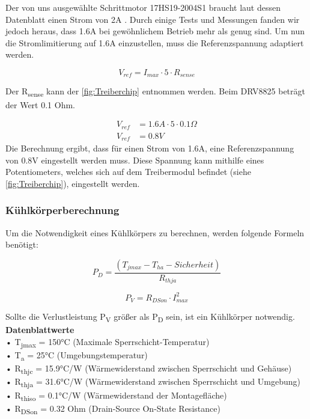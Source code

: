 Der von uns ausgewählte Schrittmotor 17HS19-2004S1 braucht laut dessen Datenblatt einen Strom von 2A .
Durch einige Tests und Messungen fanden wir jedoch heraus, dass 1.6A bei gewöhnlichem Betrieb mehr als genug sind.
Um nun die Stromlimitierung auf 1.6A einzustellen, muss die Referenzspannung adaptiert werden.

\begin{equation*}
    V_{ref} = I_{max} \cdot 5 \cdot R_{sense}
\end{equation*}

Der R\textsubscript{sense} kann der \autoref{fig:Treiberchip} entnommen werden.
Beim DRV8825 beträgt der Wert 0.1 Ohm.

\begin{align*}
    V_{ref} &= 1.6A \cdot 5 \cdot 0.1\Omega \\
    V_{ref} &= 0.8V
\end{align*}
Die Berechnung ergibt, dass für einen Strom von 1.6A, eine Referenzspannung von 0.8V eingestellt werden muss.
Diese Spannung kann mithilfe eines Potentiometers, welches sich auf dem Treibermodul befindet (siehe \autoref{fig:Treiberchip}), eingestellt werden.

\newpage
\subsubsection{Kühlkörperberechnung}
Um die Notwendigkeit eines Kühlkörpers zu berechnen, werden folgende Formeln benötigt:

\begin{equation}
    P_D = \frac{(T_{jmax} - T_{ha} - Sicherheit)}{R_{thja}}
\end{equation}

\begin{equation}
    P_V = R_{DSon} \cdot I_{max}^2
\end{equation}

Sollte die Verlustleistung P\textsubscript{V} größer als P\textsubscript{D} sein, ist ein Kühlkörper notwendig. \\

\textbf{Datenblattwerte}\\
• T\textsubscript{jmax} = 150°C (Maximale Sperrschicht-Temperatur)\\
• T\textsubscript{a} = 25°C (Umgebungstemperatur)\\
• R\textsubscript{thjc} = 15.9°C/W (Wärmewiderstand zwischen Sperrschicht und Gehäuse)\\
• R\textsubscript{thja} = 31.6°C/W (Wärmewiderstand zwischen Sperrschicht und Umgebung)\\
• R\textsubscript{thiso} = 0.1°C/W (Wärmewiderstand der Montagefläche)\\
• R\textsubscript{DSon} = 0.32 Ohm (Drain-Source On-State Resistance)

